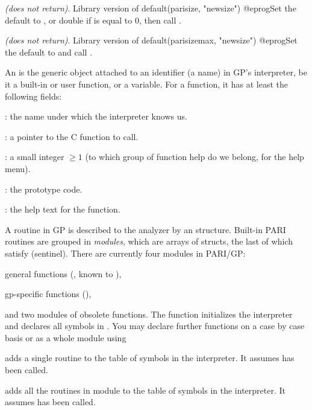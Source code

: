 \emph{(does not return)}. Library version of
\bprog
  default(parisize, "newsize")
@eprog\noindent Set the default  to , or double
 if  is equal to 0, then call
.

\emph{(does not return)}. Library version of
\bprog
  default(parisizemax, "newsize")
@eprog\noindent Set the default  to  and call
.


An  is the generic object attached to an identifier (a name)
in GP's interpreter, be it a built-in or user function, or a variable. For
a function, it has at least the following fields:

  : the name under which the interpreter knows us.

  :  a pointer to the C function to call.

  : a small integer $\geq 1$ (to which group of function
                    help do we belong, for the  help menu).

  : the prototype code.

  : the help text for the function.

A routine in GP is described to the analyzer by an 
structure. Built-in PARI routines are grouped in \emph{modules}, which
are arrays of  structs, the last of which satisfy
 (sentinel). There are currently four modules in PARI/GP:

\item general functions (, known to ),

\item gp-specific functions (),

\noindent and two modules of obsolete functions. The function
 initializes the interpreter and declares all symbols in
. You may declare further functions on a case by case
basis or as a whole module using

 adds a single routine to the
table of symbols in the interpreter. It assumes  has been
called.

 adds all the routines in module
 to the table of symbols in the interpreter. It assumes
 has been called.


